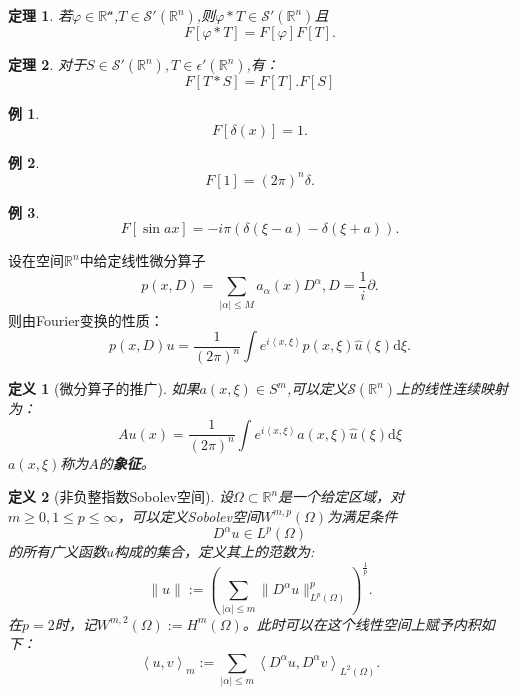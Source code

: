\documentclass[a4paper]{ctexart}
\newtheorem{Definition}{\hspace{2em}定义}[section]
\newtheorem{Example}{\hspace{2em}例}[section]
\newtheorem{Thm}{\hspace{2em}定理}[section]
\newcommand{\Rn}{\mathbb{R}^{n}}
\newcommand{\dif}{\mathrm{d}}
\newcommand{\innerprod}[2]{\left<#1,#2\right>}
\begin{document}
\begin{Thm}
    若$\varphi\in\mathscr{\Rn}$,$T\in\mathscr{S}'(\Rn)$,则$\varphi*T\in\mathscr{S}'(\Rn)$且
    \begin{equation}
        F[\varphi*T]=F[\varphi]F[T].
    \end{equation}
\end{Thm}
\begin{Thm}
    对于$S\in\mathscr{S}'(\Rn),T\in\epsilon'(\Rn)$,有：
    \begin{equation}
        F[T*S]=F[T].F[S]
    \end{equation}
\end{Thm}
\begin{Example}
    \begin{equation}
        F[\delta(x)]=1.
    \end{equation}
\end{Example}
\begin{Example}
    \begin{equation}
        F[1]=(2\pi)^{n}\delta.
    \end{equation}
\end{Example}
\begin{Example}
    \begin{equation}
        F[\sin ax]=-i\pi(\delta(\xi-a)-\delta(\xi+a)).
    \end{equation}
\end{Example}
设在空间$\Rn$中给定线性微分算子
\begin{equation}
    p(x,D)=\sum_{|\alpha|\le M}a_{\alpha}(x)D^{\alpha},D=\frac{1}{i}\partial.
\end{equation}
则由Fourier变换的性质：
\begin{equation}
    p(x,D)u=\frac{1}{(2\pi)^{n}}\int e^{i\innerprod{x}{\xi}}p(x,\xi)\hat{u}(\xi)\dif\xi.
\end{equation}
\begin{Definition}[微分算子的推广]
    如果$a(x,\xi)\in S^{m}$,可以定义$\mathscr{S}(\Rn)$上的线性连续映射为：
    \begin{equation}
        Au(x)=\frac{1}{(2\pi)^{n}}\int e^{i\innerprod{x}{\xi}}a(x,\xi)\hat{u}(\xi)\dif\xi
    \end{equation}
    $a(x,\xi)$称为$A$的\textbf{象征}。
\end{Definition}
\begin{Definition}[非负整指数Sobolev空间]
    设$\Omega\subset\Rn$是一个给定区域，对$m\ge 0,1\le p\le \infty$，可以定义Sobolev空间$W^{m,p}(\Omega)$为满足条件
    \begin{equation}
        D^{\alpha}u\in L^{p}(\Omega)
    \end{equation}
    的所有广义函数$u$构成的集合，定义其上的范数为:
    \begin{equation}
        \label{norm}
        \|u\|:=(\sum_{|\alpha|\le m}\|D^{\alpha}u\|_{L^{p}(\Omega)}^{p})^{\frac{1}{p}}.
    \end{equation}
    在$p=2$时，记$W^{m,2}(\Omega):=H^{m}(\Omega)$。此时可以在这个线性空间上赋予内积如下：
    \begin{equation}
        \innerprod{u}{v}_{m}:=\sum_{|\alpha|\le m}\innerprod{D^{\alpha}u}{D^{\alpha}v}_{L^{2}(\Omega)}.
    \end{equation}
\end{Definition}
\end{document}
